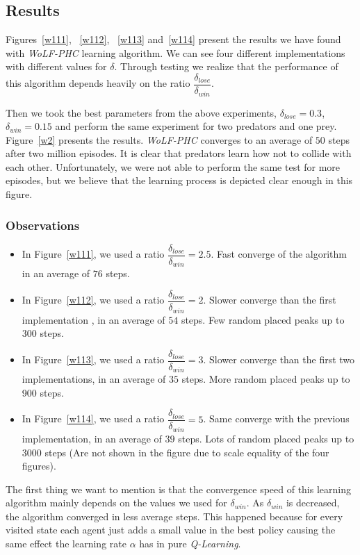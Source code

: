 \documentclass[a4paper,11pt]{article}
\begin{document}
\subsection{Results}
Figures~\ref{w111}, ~\ref{w112}, ~\ref{w113} and~\ref{w114} present the results we have found with \textit{WoLF-PHC} learning algorithm. We can see four different implementations with different values for $\delta$. Through testing we realize that the performance of this algorithm depends heavily on the ratio $\dfrac{\delta_{lose}}{\delta_{win}}$.

Then we took the best parameters from the above experiments, $\delta_{lose} = 0.3$, $\delta_{win} = 0.15$ and perform the same experiment for two predators and one prey. Figure~\ref{w2} presents the results. \textit{WoLF-PHC} converges to an average of $50$ steps after two million episodes. It is clear that predators learn how not to collide with each other. Unfortunately, we were not able to perform the same test for more episodes, but we believe that the learning process is depicted clear enough in this figure. %

\subsubsection{Observations}
\begin{itemize}
\item In Figure~\ref{w111}, we used a ratio $\dfrac{\delta_{lose}}{\delta_{win}} = 2.5$. Fast converge of the algorithm in an average of $76$ steps.
\item In Figure~\ref{w112}, we used a ratio $\dfrac{\delta_{lose}}{\delta_{win}} = 2$. Slower converge than the first implementation , in an average of $54$ steps. Few random placed peaks up to 300 steps.
\item In Figure~\ref{w113}, we used a ratio $\dfrac{\delta_{lose}}{\delta_{win}} = 3$. Slower converge than the first two implementations, in an average of $35$ steps. More random placed peaks up to 900 steps.
\item In Figure~\ref{w114}, we used a ratio $\dfrac{\delta_{lose}}{\delta_{win}} = 5$. Same converge with the previous implementation, in an average of $39$ steps. Lots of random placed peaks up to 3000 steps (Are not shown in the figure due to scale equality of the four figures).
\end{itemize}

The first thing we want to mention is that the convergence speed of this learning algorithm mainly depends on the values we used for $\delta_{win}$. As $\delta_{win}$ is decreased, the algorithm converged in less average steps. This happened because for every visited state each agent just adds a small value in the best policy causing the same effect the learning rate $\alpha$ has in pure \textit{Q-Learning}.
\end{document}

